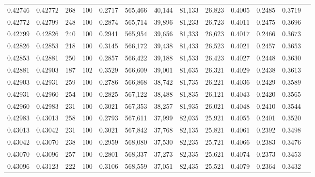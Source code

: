 \begin{tabular}{rrrrrrrrrrrrr}
0.42746 & 0.42772 &   268 & 100 &                                     0.2717 & 565,466 &  40,144 &  81,133 &  26,823 & 0.4005 & 0.2485 & 0.3719 \\
0.42772 & 0.42799 &   248 & 100 &                                     0.2874 & 565,714 &  39,896 &  81,233 &  26,723 & 0.4011 & 0.2475 & 0.3696 \\
0.42799 & 0.42826 &   240 & 100 &                                     0.2941 & 565,954 &  39,656 &  81,333 &  26,623 & 0.4017 & 0.2466 & 0.3673 \\
0.42826 & 0.42853 &   218 & 100 &                                     0.3145 & 566,172 &  39,438 &  81,433 &  26,523 & 0.4021 & 0.2457 & 0.3653 \\
0.42853 & 0.42881 &   250 & 100 &                                     0.2857 & 566,422 &  39,188 &  81,533 &  26,423 & 0.4027 & 0.2448 & 0.3630 \\
0.42881 & 0.42903 &   187 & 102 &                                     0.3529 & 566,609 &  39,001 &  81,635 &  26,321 & 0.4029 & 0.2438 & 0.3613 \\
0.42903 & 0.42931 &   259 & 100 &                                     0.2786 & 566,868 &  38,742 &  81,735 &  26,221 & 0.4036 & 0.2429 & 0.3589 \\
0.42931 & 0.42960 &   254 & 100 &                                     0.2825 & 567,122 &  38,488 &  81,835 &  26,121 & 0.4043 & 0.2420 & 0.3565 \\
0.42960 & 0.42983 &   231 & 100 &                                     0.3021 & 567,353 &  38,257 &  81,935 &  26,021 & 0.4048 & 0.2410 & 0.3544 \\
0.42983 & 0.43013 &   258 & 100 &                                     0.2793 & 567,611 &  37,999 &  82,035 &  25,921 & 0.4055 & 0.2401 & 0.3520 \\
0.43013 & 0.43042 &   231 & 100 &                                     0.3021 & 567,842 &  37,768 &  82,135 &  25,821 & 0.4061 & 0.2392 & 0.3498 \\
0.43042 & 0.43070 &   238 & 100 &                                     0.2959 & 568,080 &  37,530 &  82,235 &  25,721 & 0.4066 & 0.2383 & 0.3476 \\
0.43070 & 0.43096 &   257 & 100 &                                     0.2801 & 568,337 &  37,273 &  82,335 &  25,621 & 0.4074 & 0.2373 & 0.3453 \\
0.43096 & 0.43123 &   222 & 100 &                                     0.3106 & 568,559 &  37,051 &  82,435 &  25,521 & 0.4079 & 0.2364 & 0.3432 \\

\end{tabular}
